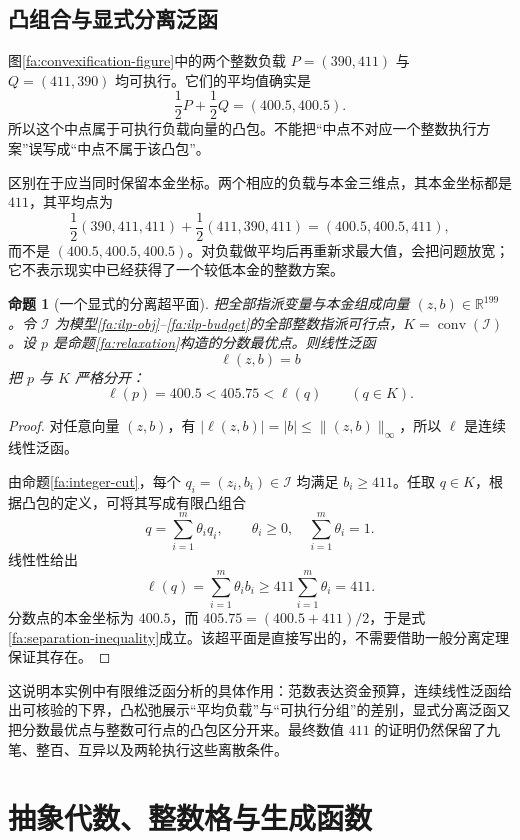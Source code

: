 \documentclass[UTF8,a4paper]{ctexbook}
\newtheorem{proposition}[theorem]{命题}
\theoremstyle{definition}
\numberwithin{equation}{chapter}
\newcommand{\1}{\mathbf{1}}
\begin{document}
\section{凸组合与显式分离泛函}

图\ref{fa:convexification-figure}中的两个整数负载 $P=(390,411)$ 与 $Q=(411,390)$ 均可执行。它们的平均值确实是
\[
\frac12P+\frac12Q=(400.5,400.5).
\]
所以这个中点属于可执行负载向量的凸包。不能把“中点不对应一个整数执行方案”误写成“中点不属于该凸包”。

区别在于应当同时保留本金坐标。两个相应的负载与本金三维点，其本金坐标都是 $411$，其平均点为
\[
\frac12(390,411,411)+\frac12(411,390,411)
=(400.5,400.5,411),
\]
而不是 $(400.5,400.5,400.5)$。对负载做平均后再重新求最大值，会把问题放宽；它不表示现实中已经获得了一个较低本金的整数方案。

\begin{proposition}[一个显式的分离超平面]\label{fa:separation}
把全部指派变量与本金组成向量 $(z,b)\in\mathbb R^{199}$。令 $\mathcal I$ 为模型\eqref{fa:ilp-obj}--\eqref{fa:ilp-budget}的全部整数指派可行点，$K=\operatorname{conv}(\mathcal I)$。设 $p$ 是命题\ref{fa:relaxation}构造的分数最优点。则线性泛函
\[
\ell(z,b)=b
\]
把 $p$ 与 $K$ 严格分开：
\begin{equation}\label{fa:separation-inequality}
\ell(p)=400.5<405.75<\ell(q)
\qquad(q\in K).
\end{equation}
\end{proposition}

\begin{proof}
对任意向量 $(z,b)$，有 $|\ell(z,b)|=|b|\le\lVert(z,b)\rVert_\infty$，所以 $\ell$ 是连续线性泛函。

由命题\ref{fa:integer-cut}，每个 $q_i=(z_i,b_i)\in\mathcal I$ 均满足 $b_i\ge411$。任取 $q\in K$，根据凸包的定义，可将其写成有限凸组合
\[
q=\sum_{i=1}^m\theta_iq_i,
\qquad \theta_i\ge0,\quad\sum_{i=1}^m\theta_i=1.
\]
线性性给出
\[
\ell(q)=\sum_{i=1}^m\theta_i b_i
\ge411\sum_{i=1}^m\theta_i=411.
\]
分数点的本金坐标为 $400.5$，而 $405.75=(400.5+411)/2$，于是式\eqref{fa:separation-inequality}成立。该超平面是直接写出的，不需要借助一般分离定理保证其存在。
\end{proof}

这说明本实例中有限维泛函分析的具体作用：范数表达资金预算，连续线性泛函给出可核验的下界，凸松弛展示“平均负载”与“可执行分组”的差别，显式分离泛函又把分数最优点与整数可行点的凸包区分开来。最终数值 $411$ 的证明仍然保留了九笔、整百、互异以及两轮执行这些离散条件。

\chapter{抽象代数、整数格与生成函数}\label{aa:chapter}
\end{document}
